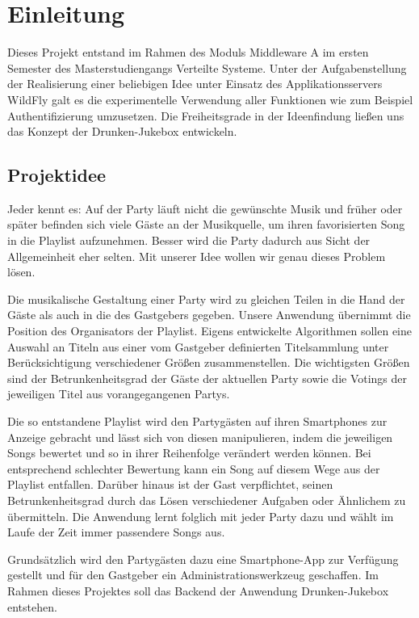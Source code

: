 \section{Einleitung}
Dieses Projekt entstand im Rahmen des Moduls Middleware A im ersten Semester des Masterstudiengangs Verteilte Systeme. Unter der Aufgabenstellung der Realisierung einer beliebigen Idee unter Einsatz des Applikationsservers WildFly galt es die experimentelle Verwendung aller Funktionen wie zum Beispiel Authentifizierung umzusetzen.
Die Freiheitsgrade in der Ideenfindung ließen uns das Konzept der Drunken-Jukebox entwickeln.

\subsection{Projektidee}
Jeder kennt es: Auf der Party läuft nicht die gewünschte Musik und früher oder später befinden sich viele Gäste an der Musikquelle, um ihren favorisierten Song in die Playlist aufzunehmen. Besser wird die Party dadurch aus Sicht der Allgemeinheit eher selten. Mit unserer Idee wollen wir genau dieses Problem lösen.

Die musikalische Gestaltung einer Party wird zu gleichen Teilen in die Hand der Gäste als auch in die des Gastgebers gegeben. Unsere Anwendung übernimmt die Position des Organisators der Playlist. Eigens entwickelte Algorithmen sollen eine Auswahl an Titeln aus einer vom Gastgeber definierten Titelsammlung unter Berücksichtigung verschiedener Größen zusammenstellen. Die wichtigsten Größen sind der Betrunkenheitsgrad der Gäste der aktuellen Party sowie die Votings der jeweiligen Titel aus vorangegangenen Partys.

Die so entstandene Playlist wird den Partygästen auf ihren Smartphones zur Anzeige gebracht und lässt sich von diesen manipulieren, indem die jeweiligen Songs bewertet und so in ihrer Reihenfolge verändert werden können. Bei entsprechend schlechter Bewertung kann ein Song auf diesem Wege aus der Playlist entfallen. Darüber hinaus ist der Gast verpflichtet, seinen Betrunkenheitsgrad durch das Lösen verschiedener Aufgaben oder Ähnlichem zu übermitteln. Die Anwendung lernt folglich mit jeder Party dazu und wählt im Laufe der Zeit immer passendere Songs aus. 

Grundsätzlich wird den Partygästen dazu eine Smartphone-App zur Verfügung gestellt und für den Gastgeber ein Administrationswerkzeug geschaffen. Im Rahmen dieses Projektes soll das Backend der Anwendung Drunken-Jukebox entstehen. 